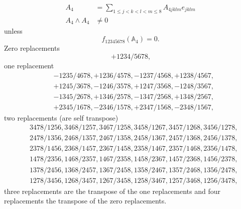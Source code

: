 \documentclass[aps, preprint]{revtex4}
\begin{document}
\begin{align}A_{4} &  ={\displaystyle\sum _{1 \leq j <k <l <m \leq 8}}A_{4 j k l m} e_{j k l m} \\
A_{4} \wedge A_{4} &  \neq 0\end{align}unless
\begin{equation}f_{1 2 3 4 5 6 7 8} \left (\mathbb{A}_{4}\right ) =0.
\end{equation}Zero replacements
\begin{equation} +1234/5678\text{,}
\end{equation}one replacement
\begin{align} &  -1235/4678 , +1236/4578 , -1237/4568 , +1238/4567\text{,} \\
 &  +1245/3678 , -1246/3578 , +1247/3568 , -1248/3567\text{,} \\
 &  -1345/2678 , +1346/2578 , -1347/2568 , +1348/2567\text{,} \\
 &  +2345/1678 , -2346/1578 , +2347/1568 , -2348/1567\text{,}\end{align}two replacements (are self transpose)
\begin{align} & 3478/1256,3468/1257,3467/1258,3458/1267,3457/1268,3456/1278\text{,} \\
 & 2478/1356,2468/1357,2467/1358,2458/1367,2457/1368,2456/1378\text{,} \\
 & 2378/1456,2368/1457,2367/1458,2358/1467,2357/1468,2356/1478\text{,} \\
 & 1478/2356,1468/2357,1467/2358,1458/2367,1457/2368,1456/2378\text{,} \\
 & 1378/2456,1368/2457,1367/2458,1358/2467,1357/2468,1356/2478\text{,} \\
 & 1278/3456,1268/3457,1267/3458,1258/3467,1257/3468,1256/3478\text{,}\end{align}three replacements are the transpose of the one replacements and four replacements the transpose of the zero replacements.
\end{document}
